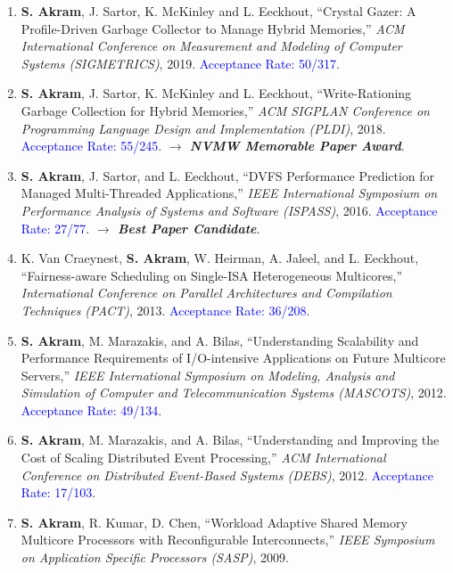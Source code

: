 \documentclass[11pt,a4paper,sans]{moderncv}
\begin{document}
{\begin{enumerate}
\item \textbf{S. Akram}, J. Sartor, K. McKinley and L. Eeckhout, ``Crystal Gazer: A Profile-Driven Garbage Collector to Manage Hybrid Memories,'' \emph{ACM International Conference on Measurement and Modeling of Computer Systems (SIGMETRICS)}, 2019. \textcolor{blue}{Acceptance Rate: 50/317}.
\item \textbf{S. Akram}, J. Sartor, K. McKinley and L. Eeckhout, ``Write-Rationing Garbage Collection for Hybrid Memories,'' \emph{ACM SIGPLAN Conference on Programming Language Design and Implementation (PLDI)}, 2018. \textcolor{blue}{Acceptance Rate: 55/245}. \newline \textcolor{BrickRed}{\textbf{$\longrightarrow$ \emph{NVMW Memorable Paper Award}}}.
\item \textbf{S. Akram}, J. Sartor, and L. Eeckhout, ``DVFS Performance Prediction for Managed Multi-Threaded Applications,'' \emph{IEEE International Symposium on Performance Analysis of Systems and Software (ISPASS)}, 2016. \textcolor{blue}{Acceptance Rate: 27/77}. \newline \textcolor{BrickRed}{\textbf{$\longrightarrow$ \emph{Best Paper Candidate}}}.
\item K. Van Craeynest, \textbf{S. Akram}, W. Heirman, A. Jaleel, and L. Eeckhout, ``Fairness-aware Scheduling on Single-ISA Heterogeneous Multicores,'' \emph{International Conference on Parallel Architectures and Compilation Techniques (PACT)}, 2013. \textcolor{blue}{Acceptance Rate: 36/208}.
\item \textbf{S. Akram}, M. Marazakis, and A. Bilas, ``Understanding Scalability and Performance Requirements of I/O-intensive Applications on Future Multicore Servers,'' \emph{IEEE International Symposium on Modeling, Analysis and Simulation of Computer and Telecommunication Systems (MASCOTS)}, 2012. \textcolor{blue}{Acceptance Rate: 49/134}.
\item \textbf{S. Akram}, M. Marazakis, and A. Bilas, ``Understanding and Improving the Cost of Scaling Distributed Event Processing,'' \emph{ACM International Conference on Distributed Event-Based Systems (DEBS)}, 2012. \textcolor{blue}{Acceptance Rate: 17/103}.
\item \textbf{S. Akram}, R. Kumar, D. Chen, ``Workload Adaptive Shared Memory Multicore Processors with Reconfigurable Interconnects,'' \emph{IEEE Symposium on Application Specific Processors (SASP)}, 2009.
\end{enumerate}
}
\end{document}
